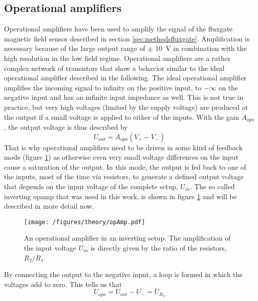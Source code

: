             \subsection{Operational amplifiers}
            Operational amplifiers have been used to amplify the signal of the fluxgate magnetic field sensor described in section \ref{sec:methodsfluxgate}. Amplification is necessary because of the large output range of $\pm$ \SI{10}{\volt} in combination with the high resolution in the low field regime. Operational amplifiers are a rather complex network of transistors that show a behavior similar to the ideal operational amplifier described in the following. The ideal operational amplifier amplifies the incoming signal to infinity on the positive input, to $-\infty$ on the negative input and has an infinite input impedance as well. This is not true in practice, but very high voltages (limited by the supply voltage) are produced at the output if a small voltage is applied to either of the inputs. With the gain $A_{opa}$, the output voltage is thus described by
                \begin{equation}
                        \label{equation:theory:OPAvoltage}
                    U_{out} = A_{opa}(V_+ - V_-)
                \end{equation}
                That is why operational amplifiers need to be driven in some kind of feedback mode (figure \ref{figure:theory:opAmp}) as otherwise even very small voltage differences on the input cause a saturation of the output. In this mode, the output is fed back to one of the inputs, most of the time via resistors, to generate a defined output voltage that depends on the input voltage of the complete setup, $U_{in}$. The so called inverting opamp that was used in this work, is shown in figure \ref{figure:theory:opAmp} and will be described in more detail now.
                \begin{figure}
                    \texttt{[image: /figures/theory/opAmp.pdf]}
                    \caption[Operational amplifier]{An operational amplifier in an inverting setup. The amplification of the input voltage $U_{in}$ is directly given by the ratio of the resistors, $R_2/R_1$.}
                    \label{figure:theory:opAmp}
                \end{figure}
                By connecting the output to the negative input, a loop is formed in which the voltages add to zero. This tells us that
                \begin{equation*}
                    U_{opa} = U_{out} - U_- = U_{R_2}
                \end{equation*}
